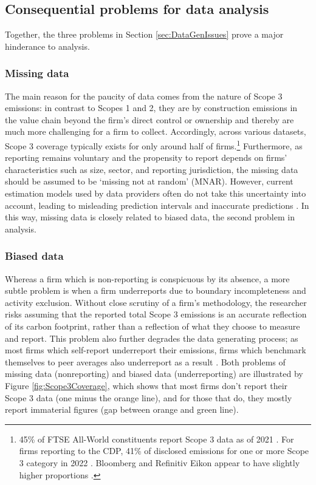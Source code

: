 \documentclass[12pt,twoside]{report}
\begin{document}
\subsection{Consequential problems for data analysis}

Together, the three problems in Section \ref{sec:DataGenIssues} prove a major hinderance to analysis. 
\subsubsection{Missing data}
The main reason for the paucity of data comes from the nature of Scope 3 emissions: in contrast to Scopes 1 and 2, they are by construction emissions in the value chain beyond the firm's direct control or ownership and thereby are much more challenging for a firm to collect. Accordingly, across various datasets, Scope 3 coverage typically exists for only around half of firms.\footnote{45\% of FTSE All-World constituents report Scope 3 data as of 2021 \cite{ftserussell2024}. For firms reporting to the CDP, 41\% of disclosed emissions for one or more Scope 3 category in 2022 \cite{cdp2023}. Bloomberg and Refinitiv Eikon appear to have slightly higher proportions \cite{Nguyenetal2023}.} Furthermore, as reporting remains voluntary and the propensity to report depends on firms' characteristics such as size, sector, and reporting jurisdiction, the missing data should be assumed to be `missing not at random' (MNAR). However, current estimation models used by data providers often do not take this uncertainty into account, leading to misleading prediction intervals and inaccurate predictions \cite{olesiewicz2021}. In this way, missing data is closely related to biased data, the second problem in analysis. 

\subsubsection{Biased data}
Whereas a firm which is non-reporting is conspicuous by its absence, a more subtle problem is when a firm underreports due to boundary incompleteness and activity exclusion. Without close scrutiny of a firm's methodology, the researcher risks assuming that the reported total Scope 3 emissions is an accurate reflection of its carbon footprint, rather than a reflection of what they choose to measure and report. This problem also further degrades the data generating process; as most firms which self-report underreport their emissions, firms which benchmark themselves to peer averages also underreport as a result \cite{Hoepner2021}. Both problems of missing data (nonreporting) and biased data (underreporting) are illustrated by Figure \ref{fig:Scope3Coverage}, which shows that most firms don't report their Scope 3 data (one minus the orange line), and for those that do, they mostly report immaterial figures (gap between orange and green line). 
\end{document}
